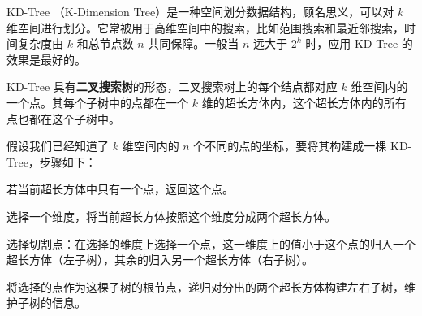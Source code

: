 
KD-Tree （K-Dimension Tree）是一种空间划分数据结构，顾名思义，可以对 $k$ 维空间进行划分。它常被用于高维空间中的搜索，比如范围搜索和最近邻搜索，时间复杂度由 $k$ 和总节点数 $n$ 共同保障。一般当 $n$ 远大于 $2^k$ 时，应用 KD-Tree 的效果是最好的。

KD-Tree 具有\textbf{二叉搜索树}的形态，二叉搜索树上的每个结点都对应 $k$ 维空间内的一个点。其每个子树中的点都在一个 $k$ 维的超长方体内，这个超长方体内的所有点也都在这个子树中。

假设我们已经知道了 $k$ 维空间内的 $n$ 个不同的点的坐标，要将其构建成一棵 KD-Tree，步骤如下：

若当前超长方体中只有一个点，返回这个点。

选择一个维度，将当前超长方体按照这个维度分成两个超长方体。

选择切割点：在选择的维度上选择一个点，这一维度上的值小于这个点的归入一个超长方体（左子树），其余的归入另一个超长方体（右子树）。

将选择的点作为这棵子树的根节点，递归对分出的两个超长方体构建左右子树，维护子树的信息。